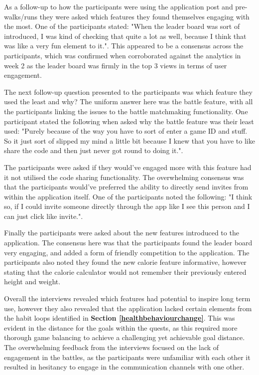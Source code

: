 \documentclass{l4proj}
\begin{document}
As a follow-up to how the participants were using the application post and pre-walks/runs they were asked which features they found themselves engaging with the most. One of the participants stated: "When the leader board was sort of introduced, I was kind of checking that quite a lot as well, because I think that was like a very fun element to it.". This appeared to be a consensus across the participants, which was confirmed when corroborated against the analytics in week 2 as the leader board was firmly in the top 3 views in terms of user engagement.

The next follow-up question presented to the participants was which feature they used the least and why? The uniform answer here was the battle feature, with all the participants linking the issues to the battle matchmaking functionality. One participant stated the following when asked why the battle feature was their least used: "Purely because of the way you have to sort of enter a game ID and stuff. So it just sort of slipped my mind a little bit because I knew that you have to like share the code and then just never got round to doing it.". 

The participants were asked if they would've engaged more with this feature had it not utilised the code sharing functionality. The overwhelming consensus was that the participants would've preferred the ability to directly send invites from within the application itself. One of the participants noted the following: "I think so, if I could invite someone directly through the app like I see this person and I can just click like invite.".

Finally the participants were asked about the new features introduced to the application. The consensus here was that the participants found the leader board very engaging, and added a form of friendly competition to the application. The participants also noted they found the new calorie feature informative, however stating that the calorie calculator would not remember their previously entered height and weight. 

Overall the interviews revealed which features had potential to inspire long term use, however they also revealed that the application lacked certain elements from the habit loops identified in \textbf{Section \ref{healthbehaviourchange}}. This was evident in the distance for the goals within the quests, as this required more thorough game balancing to achieve a challenging yet achievable goal distance. The overwhelming feedback from the interviews focused on the lack of engagement in the battles, as the participants were unfamiliar with each other it resulted in hesitancy to engage in the communication channels with one other.   
\end{document}

